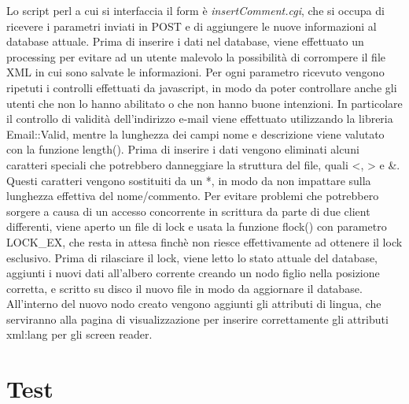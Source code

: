 \documentclass[10pt,a4paper,onecolumn]{article}
\begin{document}
Lo script perl a cui si interfaccia il form è \textit{insertComment.cgi}, che si occupa di ricevere i parametri inviati in POST e di aggiungere le nuove informazioni al database attuale.
Prima di inserire i dati nel database, viene effettuato un processing per evitare ad un utente malevolo la possibilità di corrompere il file XML in cui sono salvate le informazioni.
Per ogni parametro ricevuto vengono ripetuti i controlli effettuati da javascript, in modo da poter controllare anche gli utenti che non lo hanno abilitato o che non hanno buone intenzioni. In particolare il controllo di validità dell’indirizzo e-mail viene effettuato utilizzando la libreria Email::Valid, mentre la lunghezza dei campi nome e descrizione viene valutato con la funzione length().
Prima di inserire i dati vengono eliminati alcuni caratteri speciali che potrebbero danneggiare la struttura del file, quali <, > e \&. Questi caratteri vengono sostituiti da un *, in modo da non impattare sulla lunghezza effettiva del nome/commento.
Per evitare problemi che potrebbero sorgere a causa di un accesso concorrente in scrittura da parte di due client differenti, viene aperto un file di lock e usata la funzione flock() con parametro LOCK\_EX, che resta in attesa finchè non riesce effettivamente ad ottenere il lock esclusivo.
Prima di rilasciare il lock, viene letto lo stato attuale del database, aggiunti i nuovi dati all'albero corrente creando un nodo figlio nella posizione corretta, e scritto su disco il nuovo file in modo da aggiornare il database. All’interno del nuovo nodo creato vengono aggiunti gli attributi di lingua, che serviranno alla pagina di visualizzazione per inserire correttamente gli attributi xml:lang per gli screen reader.

\clearpage

\section{Test}
\end{document}
